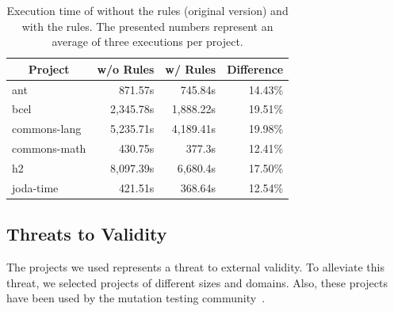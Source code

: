 \scriptsize
\begin{table}[ht]
\centering
\caption{Execution time of \mujava{} without the rules (original version) and with the rules. The presented numbers represent an average of three executions per project.}
\label{tab:execution-time}
\begin{tabular}{|l|r|r|r|}
\hline
\multicolumn{1}{|c|}{\textbf{Project}} & \multicolumn{1}{c|}{\textbf{\mujava{}  w/o Rules}} & \multicolumn{1}{c|}{\textbf{\mujava{} w/ Rules}} & \multicolumn{1}{c|}{\textbf{Difference}} \\
\hline
ant                                            & 871.57s                                                   & 745.84s                                                 & 14.43\%                                          \\ \hline
bcel                                           & 2,345.78s                                                 & 1,888.22s                                               & 19.51\%                                          \\ \hline
commons-lang                                   & 5,235.71s                                                 & 4,189.41s                                               & 19.98\%                                          \\ \hline
commons-math                                   & 430.75s                                                   & 377.3s                                                  & 12.41\%                                          \\ \hline
h2                                             & 8,097.39s                                                 & 6,680.4s                                                & 17.50\%                                          \\ \hline
joda-time                                      & 421.51s                                                   & 368.64s                                                 & 12.54\%                                          \\ \hline
\end{tabular}
\end{table}
\normalsize


\subsection{Threats to Validity}

The projects we used represents a threat to external validity. 
To alleviate this threat, we selected projects of different sizes and domains. 
Also, these projects have been used by the mutation testing community~\cite{KINTIS:2017:1, MADEYISKI:2014:1, KINTIS:2015:1}.

